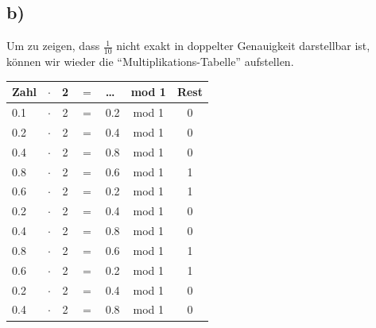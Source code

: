 \documentclass[english, parskip=full]{scrartcl}
\begin{document}
\subsection*{b)}
Um zu zeigen, dass $\frac{1}{10}$ nicht exakt in doppelter Genauigkeit darstellbar ist, können wir wieder die ``Multiplikations-Tabelle'' aufstellen. 
\begin{table}[!ht]
\centering
\begin{tabular}{lccclc|c}
Zahl & $\cdot$ & 2 & $=$ & \dots & mod 1  & Rest\\ \hline
0.1 & $\cdot$ & 2 & $=$ & 0.2 & mod 1 & 0\\
0.2 & $\cdot$ & 2 & $=$ & 0.4 & mod 1 & 0\\
0.4 & $\cdot$ & 2 & $=$ & 0.8 & mod 1 & 0\\
\color{blue}0.8 & $\cdot$ & 2 & $=$ & 0.6 & mod 1 & \color{blue}1\\
0.6 & $\cdot$ & 2 & $=$ & 0.2 & mod 1 & 1\\
0.2 & $\cdot$ & 2 & $=$ & 0.4 & mod 1 & 0\\
0.4 & $\cdot$ & 2 & $=$ & 0.8 & mod 1 & 0\\
\color{blue}0.8 & $\cdot$ & 2 & $=$ & 0.6 & mod 1 & \color{blue}1\\
0.6 & $\cdot$ & 2 & $=$ & 0.2 & mod 1 & 1\\
0.2 & $\cdot$ & 2 & $=$ & 0.4 & mod 1 & 0\\
0.4 & $\cdot$ & 2 & $=$ & 0.8 & mod 1 & 0\\

\end{tabular}
\end{table}
\end{document}
